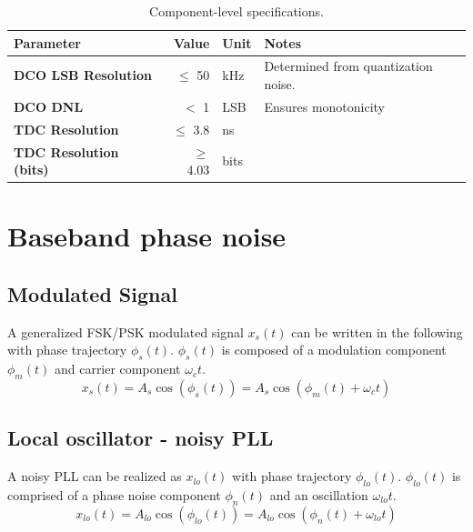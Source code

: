 \documentclass[10pt,a4paper]{article}
\begin{document}
		\scriptsize
		\begin{table}[h!]
			\centering
			\def\arraystretch{1.5}		
			\setlength\arrayrulewidth{0.75pt}
			\setlength{\tabcolsep}{1em} %
			\begin{tabular}{|l|r|l|l|}
				\hline 
				\rule[-1ex]{0pt}{2.5ex} \cellcolor{gray!40}\textbf{Parameter} & \cellcolor{gray!40}\textbf{Value} & \cellcolor{gray!40}\textbf{Unit }& \cellcolor{gray!40}\textbf{Notes}\\ 
				\hline 
				\rule[-1ex]{0pt}{2.5ex} \textbf{DCO LSB Resolution}  & $\leq$ 50  & kHz & Determined from quantization noise.\\ 
				\hline 
				\rule[-1ex]{0pt}{2.5ex} \textbf{DCO DNL} & $<$ 1 & LSB & Ensures monotonicity \\ 
				\hline 
				\rule[-1ex]{0pt}{2.5ex} \textbf{TDC Resolution} & $\leq$ 3.8  & ns & \\ 
				\hline 
				\rule[-1ex]{0pt}{2.5ex} \textbf{TDC Resolution (bits)} & $\geq$ 4.03 &bits & \\ 
				\hline 
			\end{tabular} 
			\caption{Component-level specifications.}
		\end{table}   

	\FloatBarrier
	\normalsize
	\flushleft
	\section{Baseband phase noise}
	\subsection{Modulated Signal}
	A generalized FSK/PSK modulated signal $x_s(t)$ can be written in the following with phase trajectory $\phi_s(t)$. $\phi_s(t)$ is composed of a modulation component $\phi_m(t)$ and carrier component $\omega_ct$.
	\begin{equation}
	x_s(t) = A_s\cos(\phi_s(t)) = A_s\cos(\phi_m(t)+\omega_ct)
	\end{equation} 
	\subsection{Local oscillator - noisy PLL}
	A noisy PLL can be realized as $x_{lo}(t)$ with phase trajectory $\phi_{lo}(t)$. $\phi_{lo}(t)$ is comprised of a phase noise component $\phi_{n}(t)$ and an oscillation $\omega_{lo}t$. 
	\begin{equation}
	x_{lo}(t)  = A_{lo}\cos(\phi_{lo}(t)) = A_{lo}\cos(\phi_n(t)+\omega_{lo}t)
	\end{equation} 
\end{document}
